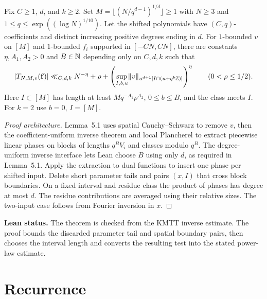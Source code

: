 \begin{theorem}\label{t:main}
\leanok
{}
Fix $C\ge1$, $d$, and $k\ge2$. Set
$M=\lfloor(N/q^{d-1})^{1/d}\rfloor\ge1$ with $N\ge3$ and
$1\le q\le\exp((\log N)^{1/10})$. Let the shifted polynomials have
$(C,q)$-coefficients and distinct increasing positive degrees ending in $d$.
For $1$-bounded $v$ on $[M]$ and $1$-bounded $f_i$
supported in $[-CN,CN]$, there are constants
$\eta,A_1,A_2>0$ and $B\in\mathbb N$ depending only on $C,d,k$ such that
\[
 \lvert T_{N,M,v}(\mathbf f)\rvert
 \ll_{C,d,k} N^{-\eta}+\rho+
   \left(\sup_{I,b,u}\lVert v\rVert_{u^{d+1}[I\cap(u+q^b\mathbb Z)]}\right)^\eta
 \qquad (0<\rho\le1/2).
\]
Here $I\subset[M]$ has length at least $Mq^{-A_1}\rho^{A_2}$,
$0\le b\le B$, and the class meets $I$. For $k=2$ use $b=0$, $I=[M]$.
\end{theorem}
\begin{proof}[Proof architecture]
\leanok
Lemma~5.1 uses spatial Cauchy--Schwarz to remove $v$, then the
coefficient-uniform inverse theorem and local Plancherel to extract
piecewise linear phases on blocks of lengths $q^BV_i$ and classes
modulo $q^B$. The degree-uniform inverse interface lets Lean choose
$B$ using only $d$, as required in Lemma~5.1. Apply the extraction
to dual functions to insert one phase per
shifted input. Delete short parameter tails and pairs $(x,I)$ that
cross block boundaries. On a fixed interval and residue class the
product of phases has degree at most $d$. The residue contributions
are averaged using their relative sizes. The two-input case follows
from Fourier inversion in $x$.
\end{proof}
\noindent\textbf{Lean status.} The theorem is checked from the
KMTT inverse estimate. The proof bounds the discarded parameter tail
and spatial boundary pairs, then chooses the interval length and
converts the resulting test into the stated power-law estimate.

\section{Recurrence}

